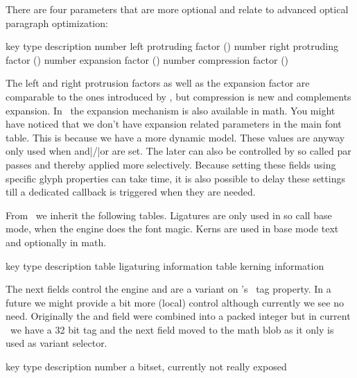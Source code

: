 {There are four parameters that are more optional and relate to advanced optical
paragraph optimization:

\starttabulate[|l|l|pl|]
\FL
\BC key                     \BC type   \BC description                               \NC \NR
\ML
\NC {}  \NC number \NC left protruding factor  (\type {\lpcode}) \NC \NR
\NC {} \NC number \NC right protruding factor (\type {\rpcode}) \NC \NR
\NC {}       \NC number \NC expansion factor        (\type {\efcode}) \NC \NR
\NC {}     \NC number \NC compression factor      (\type {\cfcode}) \NC \NR
\LL
\stoptabulate

The left and right protrusion factors as well as the expansion factor are
comparable to the ones introduced by \PDFTEX, but compression is new and
complements expansion. In \LUAMETATEX\ the expansion mechanism is also available
in math. You might have noticed that we don't have expansion related parameters
in the main font table. This is because we have a more dynamic model. These
values are anyway only used when \type {\protrudechars} and|/|or \type
{\adjustspacing} are set. The later can also be controlled by so called par
passes and thereby applied more selectively. Because setting these fields using
specific glyph properties can take time, it is also possible to delay these
settings till a dedicated callback is triggered when they are needed.

From \TEX\ we inherit the following tables. Ligatures are only used in so call
base mode, when the engine does the font magic. Kerns are used in base mode text
and optionally in math.

\starttabulate[|l|l|pl|]
\FL
\BC key               \BC type  \BC description            \NC \NR
\ML
\NC {} \NC table \NC ligaturing information \NC \NR
\NC {}     \NC table \NC kerning information    \NC \NR
\LL
\stoptabulate

The next fields control the engine and are a variant on \TEX's \TFM\ tag
property. In a future we might provide a bit more (local) control although
currently we see no need. Originally the  and  field were
combined into a packed integer but in current \LUAMETATEX\ we have a 32 bit tag
and the next field moved to the math blob as it only is used as variant selector.

\starttabulate[|l|l|pl|]
\FL
\BC key              \BC type    \BC description                            \NC \NR
\ML
\NC {}      \NC number  \NC a bitset, currently not really exposed \NC\NR
\stoptabulate

}
